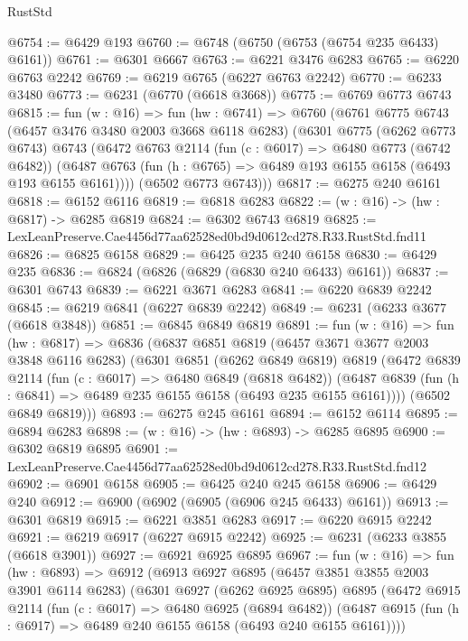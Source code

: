 \begin{lexlean}{RustStd}
\begin{coremodule}
@6754 := @6429 @193
@6760 := @6748 (@6750 (@6753 (@6754 @235 @6433) @6161))
@6761 := @6301 @6667
@6763 := @6221 @3476 @6283
@6765 := @6220 @6763 @2242
@6769 := @6219 @6765 (@6227 @6763 @2242)
@6770 := @6233 @3480
@6773 := @6231 (@6770 (@6618 @3668))
@6775 := @6769 @6773 @6743
@6815 := fun (w : @16) =>
  fun (hw : @6741) =>
  @6760
    (@6761
      @6775
      @6743
      (@6457 @3476 @3480 @2003 @3668 @6118 @6283)
      (@6301
        @6775
        (@6262 @6773 @6743)
        @6743
        (@6472
          @6763
          @2114
          (fun (c : @6017) => @6480 @6773 (@6742 @6482))
          (@6487 @6763 (fun (h : @6765) => @6489 @193 @6155 @6158 (@6493 @193 @6155 @6161))))
        (@6502 @6773 @6743)))
@6817 := @6275 @240 @6161
@6818 := @6152 @6116
@6819 := @6818 @6283
@6822 := (w : @16) -> (hw : @6817) -> @6285 @6819
@6824 := @6302 @6743 @6819
@6825 := LexLeanPreserve.Cae4456d77aa62528ed0bd9d0612cd278.R33.RustStd.fnd11
@6826 := @6825 @6158
@6829 := @6425 @235 @240 @6158
@6830 := @6429 @235
@6836 := @6824 (@6826 (@6829 (@6830 @240 @6433) @6161))
@6837 := @6301 @6743
@6839 := @6221 @3671 @6283
@6841 := @6220 @6839 @2242
@6845 := @6219 @6841 (@6227 @6839 @2242)
@6849 := @6231 (@6233 @3677 (@6618 @3848))
@6851 := @6845 @6849 @6819
@6891 := fun (w : @16) =>
  fun (hw : @6817) =>
  @6836
    (@6837
      @6851
      @6819
      (@6457 @3671 @3677 @2003 @3848 @6116 @6283)
      (@6301
        @6851
        (@6262 @6849 @6819)
        @6819
        (@6472
          @6839
          @2114
          (fun (c : @6017) => @6480 @6849 (@6818 @6482))
          (@6487 @6839 (fun (h : @6841) => @6489 @235 @6155 @6158 (@6493 @235 @6155 @6161))))
        (@6502 @6849 @6819)))
@6893 := @6275 @245 @6161
@6894 := @6152 @6114
@6895 := @6894 @6283
@6898 := (w : @16) -> (hw : @6893) -> @6285 @6895
@6900 := @6302 @6819 @6895
@6901 := LexLeanPreserve.Cae4456d77aa62528ed0bd9d0612cd278.R33.RustStd.fnd12
@6902 := @6901 @6158
@6905 := @6425 @240 @245 @6158
@6906 := @6429 @240
@6912 := @6900 (@6902 (@6905 (@6906 @245 @6433) @6161))
@6913 := @6301 @6819
@6915 := @6221 @3851 @6283
@6917 := @6220 @6915 @2242
@6921 := @6219 @6917 (@6227 @6915 @2242)
@6925 := @6231 (@6233 @3855 (@6618 @3901))
@6927 := @6921 @6925 @6895
@6967 := fun (w : @16) =>
  fun (hw : @6893) =>
  @6912
    (@6913
      @6927
      @6895
      (@6457 @3851 @3855 @2003 @3901 @6114 @6283)
      (@6301
        @6927
        (@6262 @6925 @6895)
        @6895
        (@6472
          @6915
          @2114
          (fun (c : @6017) => @6480 @6925 (@6894 @6482))
          (@6487 @6915 (fun (h : @6917) => @6489 @240 @6155 @6158 (@6493 @240 @6155 @6161))))

\end{coremodule}
\end{lexlean}
